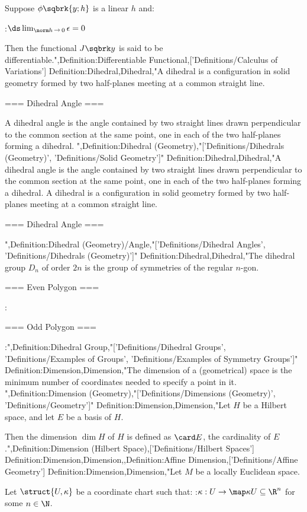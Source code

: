 Suppose $\phi \sqbrk {y; h}$ is a linear  $h$ and:

:$\ds \lim_{\norm h \mathop \to 0} \epsilon = 0$


Then the functional $J \sqbrk y $ is said to be differentiable.",Definition:Differentiable Functional,['Definitions/Calculus of Variations']
Definition:Dihedral,Dihedral,"A dihedral is a configuration in solid geometry formed by two half-planes meeting at a common straight line.


=== Dihedral Angle ===

A dihedral angle is the angle contained by two straight lines drawn perpendicular to the common section at the same point, one in each of the two half-planes forming a dihedral.
",Definition:Dihedral (Geometry),"['Definitions/Dihedrals (Geometry)', 'Definitions/Solid Geometry']"
Definition:Dihedral,Dihedral,"A dihedral angle is the angle contained by two straight lines drawn perpendicular to the common section at the same point, one in each of the two half-planes forming a dihedral.
A dihedral is a configuration in solid geometry formed by two half-planes meeting at a common straight line.


=== Dihedral Angle ===

",Definition:Dihedral (Geometry)/Angle,"['Definitions/Dihedral Angles', 'Definitions/Dihedrals (Geometry)']"
Definition:Dihedral,Dihedral,"The dihedral group $D_n$ of order $2 n$ is the group of symmetries of the regular $n$-gon.


=== Even Polygon ===


:

=== Odd Polygon ===


:",Definition:Dihedral Group,"['Definitions/Dihedral Groups', 'Definitions/Examples of Groups', 'Definitions/Examples of Symmetry Groups']"
Definition:Dimension,Dimension,"The dimension of a (geometrical) space is the minimum number of coordinates needed to specify a point in it.
",Definition:Dimension (Geometry),"['Definitions/Dimensions (Geometry)', 'Definitions/Geometry']"
Definition:Dimension,Dimension,"Let $H$ be a Hilbert space, and let $E$ be a basis of $H$.


Then the dimension $\dim H$ of $H$ is defined as $\card E$, the cardinality of $E$.",Definition:Dimension (Hilbert Space),['Definitions/Hilbert Spaces']
Definition:Dimension,Dimension,,Definition:Affine Dimension,['Definitions/Affine Geometry']
Definition:Dimension,Dimension,"Let $M$ be a locally Euclidean space. 

Let $\struct {U, \kappa}$ be a coordinate chart such that: 
:$\kappa: U \to \map \kappa U \subseteq \R^n$
for some $n \in \N$.


